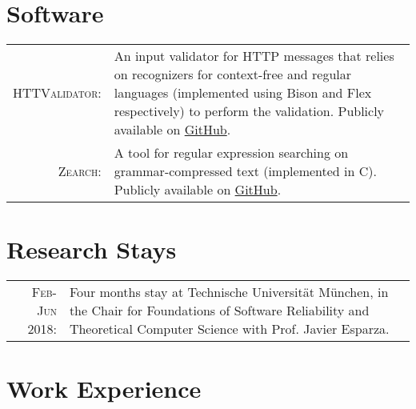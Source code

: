 \documentclass[a4paper,10pt]{article} %
\begin{document}

\section{Software}

\begin{tabular}{rp{11cm}}
\textsc{HTTValidator}: & An input validator for HTTP messages that relies on recognizers for context-free and regular languages (implemented using Bison and Flex respectively) to perform the validation. Publicly available on \href{https://github.com/pevalme/HTTPValidator}{GitHub}. \\

\textsc{Zearch}: & A tool for regular expression searching on grammar-compressed text (implemented in C). Publicly available on \href{https://github.com/pevalme/zearch}{GitHub}.\\
\end{tabular}


\section{Research Stays}

\begin{tabular}{rp{13cm}}
\textsc{Feb-Jun 2018}: & Four months stay at Technische Universität München, in the Chair for Foundations of Software Reliability and Theoretical Computer Science with Prof. Javier Esparza. 
\end{tabular}


\section{Work Experience}
\end{document}
